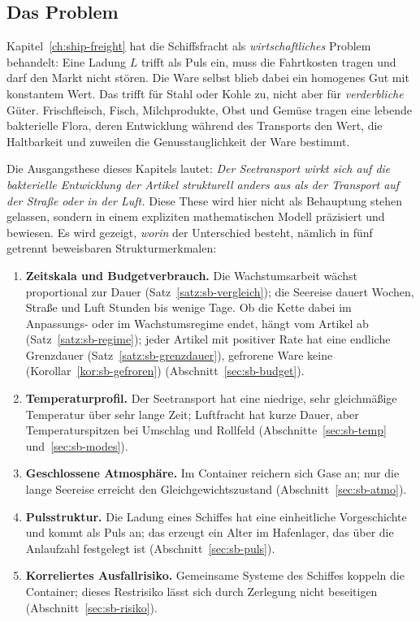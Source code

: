 \documentclass[a4paper, 12pt, twoside, openright]{report}
\theoremstyle{definition}
\theoremstyle{definition}
\begin{document}
\subsection{Das Problem}

Kapitel~\ref{ch:ship-freight} hat die Schiffsfracht als \emph{wirtschaftliches} Problem
behandelt: Eine Ladung $L$ trifft als Puls ein, muss die Fahrtkosten tragen und darf den
Markt nicht stören. Die Ware selbst blieb dabei ein homogenes Gut mit konstantem Wert. Das
trifft für Stahl oder Kohle zu, nicht aber für \emph{verderbliche} Güter. Frischfleisch,
Fisch, Milchprodukte, Obst und Gemüse tragen eine lebende bakterielle Flora, deren
Entwicklung während des Transports den Wert, die Haltbarkeit und zuweilen die
Genusstauglichkeit der Ware bestimmt.

Die Ausgangsthese dieses Kapitels lautet: \emph{Der Seetransport wirkt sich auf die
bakterielle Entwicklung der Artikel strukturell anders aus als der Transport auf der
Straße oder in der Luft.} Diese These wird hier nicht als Behauptung stehen gelassen,
sondern in einem expliziten mathematischen Modell präzisiert und bewiesen. Es wird
gezeigt, \emph{worin} der Unterschied besteht, nämlich in fünf getrennt beweisbaren
Strukturmerkmalen:

\begin{enumerate}
  \item \textbf{Zeitskala und Budgetverbrauch.} Die Wachstumsarbeit wächst proportional zur
    Dauer (Satz~\ref{satz:sb-vergleich}); die Seereise dauert Wochen, Straße und Luft Stunden
    bis wenige Tage. Ob die Kette dabei im Anpassungs- oder im Wachstumsregime endet, hängt
    vom Artikel ab (Satz~\ref{satz:sb-regime}); jeder Artikel mit positiver Rate hat eine
    endliche Grenzdauer (Satz~\ref{satz:sb-grenzdauer}), gefrorene Ware keine
    (Korollar~\ref{kor:sb-gefroren}) (Abschnitt~\ref{sec:sb-budget}).
  \item \textbf{Temperaturprofil.} Der Seetransport hat eine niedrige, sehr gleichmäßige
    Temperatur über sehr lange Zeit; Luftfracht hat kurze Dauer, aber Temperaturspitzen bei
    Umschlag und Rollfeld (Abschnitte~\ref{sec:sb-temp} und~\ref{sec:sb-modes}).
  \item \textbf{Geschlossene Atmosphäre.} Im Container reichern sich Gase an; nur die lange
    Seereise erreicht den Gleichgewichtszustand (Abschnitt~\ref{sec:sb-atmo}).
  \item \textbf{Pulsstruktur.} Die Ladung eines Schiffes hat eine einheitliche
    Vorgeschichte und kommt als Puls an; das erzeugt ein Alter im Hafenlager, das über die
    Anlaufzahl festgelegt ist (Abschnitt~\ref{sec:sb-puls}).
  \item \textbf{Korreliertes Ausfallrisiko.} Gemeinsame Systeme des Schiffes koppeln die
    Container; dieses Restrisiko lässt sich durch Zerlegung nicht beseitigen
    (Abschnitt~\ref{sec:sb-risiko}).
\end{enumerate}
\end{document}
